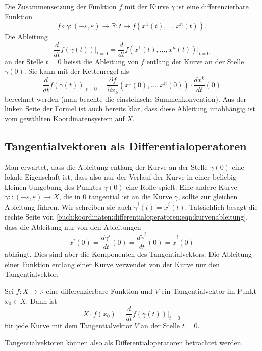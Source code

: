 Die Zusammensetzung der Funktion $f$ mit der Kurve $\gamma$ ist eine
differenzierbare Funktion
\[
f\circ\gamma
\colon
(-\varepsilon,\varepsilon) \to \mathbb{R}
:
t
\mapsto
f(x^1(t),\dots,x^n(t)).
\]
Die Ableitung
\[
\frac{d}{dt} f(\gamma(t))
\bigg|_{t=0}
=
\frac{d}{dt} f(x^1(t),\dots,x^n(t))
\bigg|_{t=0}
\]
an der Stelle $t=0$ heisst die Ableitung von $f$ entlang der Kurve
an der Stelle $\gamma(0)$.
Sie kann mit der Kettenregel als
\begin{equation}
\frac{d}{dt} f(\gamma(t))
\bigg|_{t=0}
=
\frac{\partial f}{\partial x_k}(x^1(0),\dots,x^n(0))
\cdot
\frac{dx^k}{dt}(0)
\label{buch:koordinaten:differentialoperatoren:eqn:kurvenableitung}
\end{equation}
berechnet werden (man beachte die einsteinsche Summenkonvention).
Aus der linken Seite der Formel ist auch bereits klar, dass diese
Ableitung unabhängig ist vom gewählten Koordinatensystem auf $X$.

%
%
\subsection{Tangentialvektoren als Differentialoperatoren}
Man erwartet, dass die Ableitung entlang der Kurve an der Stelle
$\gamma(0)$ eine lokale Eigenschaft ist, dass also nur der Verlauf
der Kurve in einer beliebig kleinen Umgebung des Punktes $\gamma(0)$
eine Rolle spielt.
Eine andere Kurve $\tilde{\gamma}:\colon(-\varepsilon,\varepsilon)\to X$,
die in $0$ tangential ist an die Kurve $\gamma$, sollte zur gleichen
Ableitung führen.
Wir schreiben sie auch $\tilde{\gamma}^i(t) = \tilde{x}^i(t)$.
Tatsächlich besagt die rechte Seite von
\eqref{buch:koordinaten:differentialoperatoren:eqn:kurvenableitung},
dass die Ableitung nur von den Ableitungen
\[
\dot{x}^i(0)
=
\frac{d\gamma^i}{dt}(0)
=
\frac{d\tilde{\gamma}^i}{dt}(0)
=
\dot{\tilde{x}}^i(0)
\]
abhängt.
Dies sind aber die Komponenten des Tangentialvektors.
Die Ableitung einer Funktion entlang einer Kurve verwendet von
der Kurve nur den Tangentialvektor.

\begin{definition}
Sei $f\colon X\to\mathbb{R}$ eine differenzierbare Funktion und
$V$ ein Tangentialvektor im Punkt $x_0\in X$.
Dann ist
\[
X\cdot f(x_0)
=
\frac{d}{dt} f(\gamma(t))\bigg|_{t=0}
\]
für jede Kurve mit dem Tangentialvektor $V$ an der Stelle $t=0$.
\end{definition}

Tangentialvektoren können also als Differentialoperatoren betrachtet
werden.

